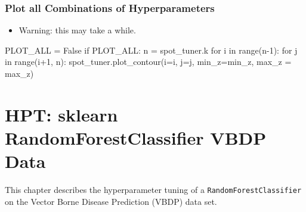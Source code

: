 \documentclass[
  letterpaper,
  DIV=11,
  numbers=noendperiod]{scrreprt}
\newenvironment{Shaded}{\begin{snugshade}}{\end{snugshade}}
\newcommand{\BuiltInTok}[1]{\textcolor[rgb]{0.00,0.23,0.31}{#1}}
\newcommand{\ControlFlowTok}[1]{\textcolor[rgb]{0.00,0.23,0.31}{#1}}
\newcommand{\DecValTok}[1]{\textcolor[rgb]{0.68,0.00,0.00}{#1}}
\newcommand{\KeywordTok}[1]{\textcolor[rgb]{0.00,0.23,0.31}{#1}}
\newcommand{\NormalTok}[1]{\textcolor[rgb]{0.00,0.23,0.31}{#1}}
\newcommand{\OperatorTok}[1]{\textcolor[rgb]{0.37,0.37,0.37}{#1}}
\newcommand{\VariableTok}[1]{\textcolor[rgb]{0.07,0.07,0.07}{#1}}
\providecommand{\tightlist}{%
  \setlength{\itemsep}{0pt}\setlength{\parskip}{0pt}}\usepackage{longtable,booktabs,array}
\begin{document}
\hypertarget{plot-all-combinations-of-hyperparameters}{%
\subsection{Plot all Combinations of
Hyperparameters}\label{plot-all-combinations-of-hyperparameters}}

\begin{itemize}
\tightlist
\item
  Warning: this may take a while.
\end{itemize}

\begin{Shaded}
\begin{Highlighting}[]
\NormalTok{PLOT\_ALL }\OperatorTok{=} \VariableTok{False}
\ControlFlowTok{if}\NormalTok{ PLOT\_ALL:}
\NormalTok{    n }\OperatorTok{=}\NormalTok{ spot\_tuner.k}
    \ControlFlowTok{for}\NormalTok{ i }\KeywordTok{in} \BuiltInTok{range}\NormalTok{(n}\OperatorTok{{-}}\DecValTok{1}\NormalTok{):}
        \ControlFlowTok{for}\NormalTok{ j }\KeywordTok{in} \BuiltInTok{range}\NormalTok{(i}\OperatorTok{+}\DecValTok{1}\NormalTok{, n):}
\NormalTok{            spot\_tuner.plot\_contour(i}\OperatorTok{=}\NormalTok{i, j}\OperatorTok{=}\NormalTok{j, min\_z}\OperatorTok{=}\NormalTok{min\_z, max\_z }\OperatorTok{=}\NormalTok{ max\_z)}
\end{Highlighting}
\end{Shaded}

\hypertarget{sec-hpt-random-forest-classifier}{%
\chapter{HPT: sklearn RandomForestClassifier VBDP
Data}\label{sec-hpt-random-forest-classifier}}

This chapter describes the hyperparameter tuning of a
\texttt{RandomForestClassifier} on the Vector Borne Disease Prediction
(VBDP) data set.
\end{document}
